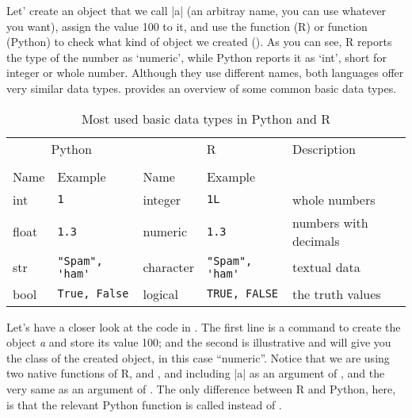 Let' create an object that we call |a| (an arbitray name, you can use
whatever you want), assign the value 100 to it, and use the 
function (R) or  function (Python) to check what kind of
object we created ().
As you can see, R reports the type of the number as `numeric', while Python reports it
as `int', short for integer or whole number.  Although they use
different names, both languages offer very similar data types.
 provides an overview of some common basic data types.


\newcommand{\fndouble}{In R, double and numeric can generally be used
  interchangably (there is a subtle difference, but that is not
  relevant here).}

\begin{table}
  \caption{\label{tab:types}Most used basic data types in Python and R}{
  \begin{tabularx}{\textwidth}{lllll}
    \toprule
    \multicolumn{2}{c}{Python} & \multicolumn{2}{c}{R}& Description \\
    \cmidrule(lr){1-2}    \cmidrule(lr){3-4}\\
    Name & Example & Name & Example \\
    \midrule
    int   & \verb+1+             & integer   & \verb+1L+             & whole numbers \\
    float & \verb+1.3+           & numeric   & \verb+1.3+           & numbers with decimals \\
    str   & \verb+"Spam", 'ham'+ & character & \verb+"Spam", 'ham'+ & textual data  \\ 
    bool  & \verb+True, False+   & logical   & \verb+TRUE, FALSE+   & the truth values \\
    \bottomrule
  \end{tabularx}}{}
\end{table}
    


Let's have a closer look at the code in .
The first line is a command to create the object \emph{a} and store
its value 100; and the second is illustrative and will give you the
class of the created object, in this case ``numeric''. Notice that we
are using two native functions of R,  and , and
including |a| as an argument of , and the very same
 as an argument of . The only difference
between R and Python, here, is that the relevant Python function is
called  instead of .

